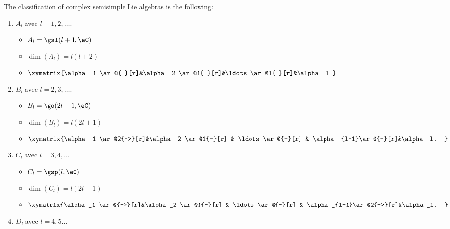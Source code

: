 The classification of complex semisimple Lie algebras is the following:
\begin{enumerate}
	\item
	      \( A_l\) avec \( l=1,2,\ldots \).
	      \begin{itemize}
		      \item \( A_l=\gsl(l+1,\eC)\)
		      \item \( \dim(A_l)=l(l+2)\)
		      \item $
			            \xymatrix{%
				            \alpha_1 \ar@{-}[r]&\alpha_2  \ar@1{-}[r]&\ldots  \ar@1{-}[r]&\alpha_l
			            }$
	      \end{itemize}
	\item
	      \( B_l\) avec \( l=2,3,\ldots\).
	      \begin{itemize}
		      \item \( B_l=\go(2l+1,\eC)\)
		      \item \( \dim(B_l)=l(2l+1)\)
		      \item $
			            \xymatrix{%
				            \alpha_1 \ar@2{->}[r]&\alpha_2  \ar@1{-}[r]   & \ldots \ar@{-}[r] & \alpha_{l-1}\ar@{-}[r]&\alpha_l.
			            }   $
	      \end{itemize}
	\item
	      \( C_l\) avec \( l=3,4,\ldots\)
	      \begin{itemize}
		      \item \( C_l=\gsp(l,\eC)\)
		      \item \( \dim(C_l)=l(2l+1)\)
		      \item $
			            \xymatrix{%
				            \alpha_1 \ar@{->}[r]&\alpha_2  \ar@1{-}[r]   & \ldots \ar@{-}[r] & \alpha_{l-1}\ar@2{->}[r]&\alpha_l.
			            }   $
	      \end{itemize}
	\item \( D_l\) avec \( l=4,5\ldots\)
\end{enumerate}

